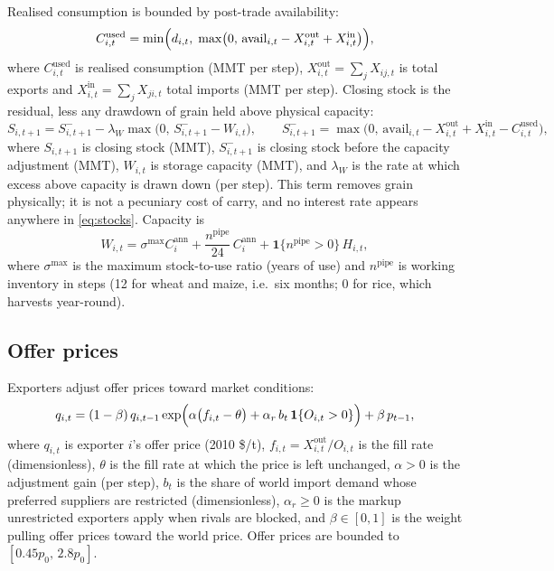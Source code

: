 Realised consumption is bounded by post-trade availability:
\begin{equation}
C^{\mathrm{used}}_{i,t}=\min\Bigl(d_{i,t},\;
\max\bigl(0,\,\mathrm{avail}_{i,t}-X^{\mathrm{out}}_{i,t}+X^{\mathrm{in}}_{i,t}\bigr)\Bigr),
\label{eq:consumption}
\end{equation}
where \(C^{\mathrm{used}}_{i,t}\) is realised consumption (MMT per step),
\(X^{\mathrm{out}}_{i,t}=\sum_j X_{ij,t}\) is total exports and
\(X^{\mathrm{in}}_{i,t}=\sum_j X_{ji,t}\) total imports (MMT per step).
Closing stock is the residual, less any drawdown of grain held above
physical capacity:
\begin{equation}
S_{i,t+1}=S^{-}_{i,t+1}-\lambda_W\max\bigl(0,\,S^{-}_{i,t+1}-W_{i,t}\bigr),
\qquad
S^{-}_{i,t+1}=\max\bigl(0,\,\mathrm{avail}_{i,t}-X^{\mathrm{out}}_{i,t}
+X^{\mathrm{in}}_{i,t}-C^{\mathrm{used}}_{i,t}\bigr),
\label{eq:stocks}
\end{equation}
where \(S_{i,t+1}\) is closing stock (MMT), \(S^{-}_{i,t+1}\) is closing
stock before the capacity adjustment (MMT), \(W_{i,t}\) is storage
capacity (MMT), and \(\lambda_W\) is the rate at which excess above
capacity is drawn down (per step). This term removes grain physically; it
is not a pecuniary cost of carry, and no interest rate appears anywhere in
\eqref{eq:stocks}. Capacity is
\begin{equation}
W_{i,t}=\sigma^{\max}C^{\mathrm{ann}}_i
+\frac{n^{\mathrm{pipe}}}{24}\,C^{\mathrm{ann}}_i
+\mathbf{1}\{n^{\mathrm{pipe}}>0\}\,H_{i,t},
\label{eq:capacity}
\end{equation}
where \(\sigma^{\max}\) is the maximum stock-to-use ratio (years of use)
and \(n^{\mathrm{pipe}}\) is working inventory in steps (12 for wheat and
maize, i.e.\ six months; 0 for rice, which harvests year-round).

\subsection{Offer prices}

Exporters adjust offer prices toward market conditions:
\begin{equation}
q_{i,t}=(1-\beta)\,q_{i,t-1}
\exp\Bigl(\alpha\bigl(f_{i,t}-\theta\bigr)+\alpha_r\,b_t\,\mathbf{1}\{O_{i,t}>0\}\Bigr)
+\beta\,p_{t-1},
\label{eq:ask}
\end{equation}
where \(q_{i,t}\) is exporter \(i\)'s offer price (2010 \$/t),
\(f_{i,t}=X^{\mathrm{out}}_{i,t}/O_{i,t}\) is the fill rate
(dimensionless), \(\theta\) is the fill rate at which the price is left
unchanged, \(\alpha>0\) is the adjustment gain (per step), \(b_t\) is the
share of world import demand whose preferred suppliers are restricted
(dimensionless), \(\alpha_r\ge 0\) is the markup unrestricted exporters
apply when rivals are blocked, and \(\beta\in[0,1]\) is the weight pulling
offer prices toward the world price. Offer prices are bounded to
\([0.45p_0,\,2.8p_0]\).

